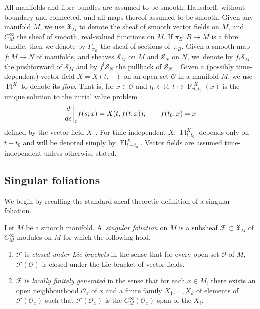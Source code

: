 \documentclass[11pt]{article}
\numberwithin{equation}{section}
\numberwithin{equation}{section}
\def\Fl{\operatorname{Fl}}
\def\FF{{\mathcal{F}}}
\def\OO{{\mathcal{O}}}
\def\SS{{\mathscr{S}}}
\def\RB{{\mathbb{R}}}
\def\XF{{\mathfrak{X}}}
\begin{document}
All manifolds and fibre bundles are assumed to be smooth, Hausdorff, without boundary and connected, and all maps thereof assumed to be smooth. Given any manifold $M$, we use $\XF_{M}$ to denote the sheaf of smooth vector fields on $M$, and $C^{\infty}_{M}$ the sheaf of smooth, real-valued functions on $M$. If $\pi_{B}\colon B\rightarrow M$ is a fibre bundle, then we denote by $\Gamma_{\pi_{B}}$ the sheaf of sections of~$\pi_{B}$. Given a smooth map $f\colon M\rightarrow N$ of manifolds, and sheaves $\SS_{M}$ on $M$ and $\SS_{N}$ on $N$, we~denote by $f_{!}\SS_{M}$ the pushforward of $\SS_{M}$ and by $f^{!}\SS_{N}$ the pullback of $\SS_{N}$~\cite[p.~65]{hartshorne}. Given a (possibly time-dependent) vector field $X = X(t,-)$ on an open set $\OO$ in a manifold $M$, we use $\Fl^{X}$ to denote its \textit{flow}. That is, for $x\in\OO$ and $t_{0}\in\RB$, $t\mapsto\Fl^{X}_{t,t_{0}}(x)$ is the unique solution to the initial value problem
\begin{gather*}
\frac{\rm d}{{\rm d}s}\bigg|_{t}f(s;x) = X(t,f(t;x)),\qquad f(t_{0};x) = x
\end{gather*}
defined by the vector field $X$~\cite[p.~236]{leesmth}. For time-independent $X$, $\Fl^{X}_{t,t_{0}}$ depends only on $t-t_{0}$ and will be denoted simply by $\Fl^{X}_{t-t_{0}}$. Vector fields are assumed time-independent unless otherwise stated.

\subsection{Singular foliations}

We begin by recalling the standard sheaf-theoretic definition of a singular foliation.

\begin{Definition}\label{singdef}
Let $M$ be a smooth manifold. A~\textit{singular foliation} on $M$ is a subsheaf $\FF\subset \XF_{M}$ of $C^{\infty}_{M}$-modules on $M$ for which the following hold.
\begin{enumerate}\itemsep=0pt
\item $\FF$ is \textit{closed under Lie brackets} in the sense that for every open set $\OO$ of $M$, $\FF(\OO)$ is closed under the Lie bracket of vector fields.
\item $\FF$ is \textit{locally finitely generated} in the sense that for each $x\in M$, there exists an open neighbourhood $\OO_{x}$ of $x$ and a finite family $X_{1},\dots,X_{k}$ of elements of $\FF(\OO_{x})$ such that $\FF(\OO_{x})$ is the $C^{\infty}_{M}(\OO_{x})$-span of the $X_{i}$.
\end{enumerate}
\end{Definition}
\end{document}
